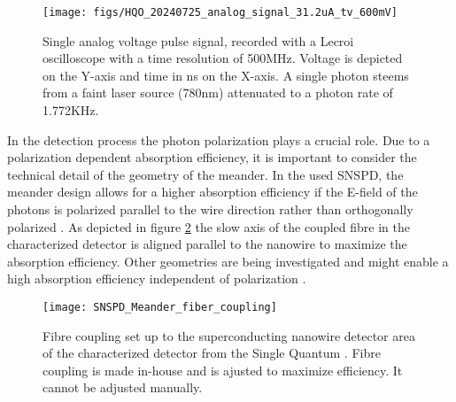 \begin{figure}
    \centering
    \texttt{[image: figs/HQO\_20240725\_analog\_signal\_31.2uA\_tv\_600mV]}
    \caption{Single analog voltage pulse signal, recorded with a Lecroi oscilloscope with a time resolution of 500MHz.
    Voltage is depicted on the Y-axis and time in ns on the X-axis. A single photon steems from a faint laser source (780nm) attenuated to a photon rate of 1.772KHz.}
    \label{fig:SNSPD_single_voltage_pulse}
\end{figure}

In the detection process the photon polarization plays a crucial role.
Due to a polarization dependent absorption efficiency, it is important to consider the technical detail of the geometry of the meander.
In the used SNSPD, the meander design allows for a higher absorption efficiency if the E-field of the photons
is polarized parallel to the wire direction rather than orthogonally polarized \cite{single-quantum-2022}.
As depicted in figure \ref{fig:SNSPD_fiber_coupling} the slow axis of the coupled fibre in the characterized
detector is aligned parallel to the nanowire to maximize the absorption efficiency.
Other geometries are being investigated and might enable a high absorption efficiency independent of polarization \cite{zheng-2016}.

\begin{figure}
    \centering
    \texttt{[image: SNSPD\_Meander\_fiber\_coupling]}
    \caption{Fibre coupling set up to the superconducting nanowire detector area of the characterized detector from the Single Quantum \cite{singlequantum_snsd}.
    Fibre coupling is made in-house and is ajusted to maximize efficiency. It cannot be adjusted manually.}
    \label{fig:SNSPD_fiber_coupling}
\end{figure}

